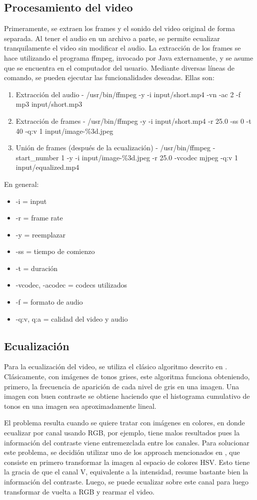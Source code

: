 \documentclass[12pt,spanish]{article}
\begin{document}
	\subsection{Procesamiento del video}
	Primeramente, se extraen los frames y el sonido del video original de forma separada. Al tener el audio en un archivo a parte, se permite ecualizar tranquilamente el video sin modificar el audio. La extracci\'on de los frames se hace utilizando el programa ffmpeg, invocado por Java externamente, y se asume que se encuentra en el computador del usuario. Mediante diversas l\'ineas de comando, se pueden ejecutar las funcionalidades deseadas. Ellas son:
	\begin{enumerate}
		\item Extracci\'on del audio - /usr/bin/ffmpeg -y -i input/short.mp4 -vn -ac 2 -f mp3 input/short.mp3
		\item Extracci\'on de frames - /usr/bin/ffmpeg -y -i input/short.mp4 -r 25.0 -ss 0 -t 40 -q:v 1 input/image-\%3d.jpeg
		\item Uni\'on de frames (despu\'es de la ecualizaci\'on) - /usr/bin/ffmpeg -start\_number 1 -y -i input/image-\%3d.jpeg -r 25.0 -vcodec mjpeg -q:v 1 input/equalized.mp4
	\end{enumerate}
	En general: 
	\begin{itemize}
		\item -i = input
		\item -r = frame rate
		\item -y = reemplazar
		\item -ss = tiempo de comienzo
		\item -t = duraci\'on
		\item -vcodec, -acodec = codecs utilizados
		\item -f = formato de audio
		\item -q:v, q:a = calidad del video y audio
	\end{itemize}
	\subsection{Ecualizaci\'on}
	Para la ecualizaci\'on del video, se utiliza el cl\'asico algoritmo descrito en \cite{equalization}. Cl\'asicamente, con im\'agenes de tonos grises, este algoritma funciona obteniendo, primero, la frecuencia de aparici\'on de cada nivel de gris en una imagen. Una imagen con buen contraste se obtiene haciendo que el histograma cumulativo de tonos en una imagen sea aproximadamente lineal. 

	El problema resulta cuando se quiere tratar con im\'agenes en colores, en donde ecualizar por canal usando RGB, por ejemplo, tiene malos resultados pues la informaci\'on del contraste viene entremezclada entre los canales. Para solucionar este problema, se decidi\'on utilizar uno de los approach mencionados en \cite{paper}, que consiste en primero transformar la imagen al espacio de colores HSV. Esto tiene la gracia de que el canal V, equivalente a la intensidad, resume bastante bien la informaci\'on del contraste. Luego, se puede ecualizar sobre este canal para luego transformar de vuelta a RGB y rearmar el video.
\end{document}
